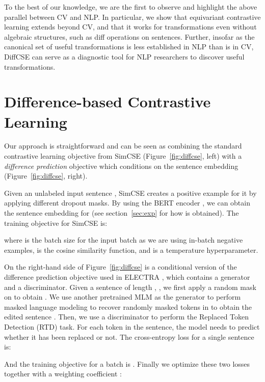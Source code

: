 \documentclass[11pt]{article}
\newcommand{\ba}{\xspace}
\begin{document}
To the best of our knowledge, we are the first to observe and highlight the above parallel between CV and NLP. In particular, we show that equivariant contrastive learning extends beyond CV, and that it works for transformations even without algebraic structures, such as diff operations on sentences. Further, insofar as the canonical set of useful transformations is less established in NLP than is in CV, DiffCSE can serve as a diagnostic tool for NLP researchers to discover useful transformations.


\section{Difference-based Contrastive Learning}
\label{sec:method}


Our approach is straightforward and can be seen as combining the standard contrastive learning objective from SimCSE (Figure~\ref{fig:diffcse}, left) with a \emph{difference prediction} objective which conditions on the sentence embedding (Figure~\ref{fig:diffcse}, right). 


Given an unlabeled input sentence , SimCSE creates a positive example  for it by applying different dropout masks. By using the {BERT\ba} encoder , we can obtain the sentence embedding  for  (see section~\ref{sec:exp} for how  is obtained). The training objective for SimCSE is:
\vspace{-5pt}

where  is the batch size for the input batch  as we are using in-batch negative examples,  is the cosine similarity function, and  is a temperature hyperparameter.

On the right-hand side of Figure~\ref{fig:diffcse} is a conditional version of the difference prediction objective used in ELECTRA \cite{clark2020electra}, which contains a generator and a discriminator. Given a sentence of length , , we first apply a random mask  on  to obtain . We use another pretrained MLM as the generator  to perform masked language modeling to recover randomly masked tokens in  to obtain the edited sentence . Then, we use a discriminator  to perform the Replaced Token Detection (RTD) task. For each token in the sentence, the model needs to predict whether it has been replaced or not. The cross-entropy loss for a single sentence  is:
\vspace{-5pt}

And the training objective for a batch is .
Finally we optimize these two losses together with a weighting coefficient :
\vspace{-5pt}
\end{document}
